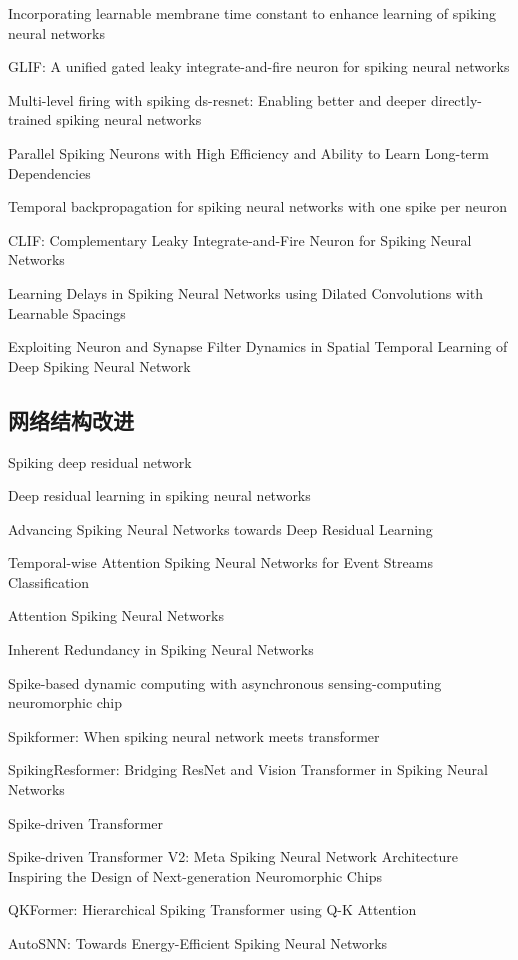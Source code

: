 \documentclass{SCIS2020cn}
\begin{document}
Incorporating learnable membrane time constant to enhance learning of spiking neural networks

GLIF: A unified gated leaky integrate-and-fire neuron for spiking neural networks

Multi-level firing with spiking ds-resnet: Enabling better and deeper directly-trained spiking neural networks

Parallel Spiking Neurons with High Efficiency and Ability to Learn Long-term Dependencies

Temporal backpropagation for spiking neural networks with one spike per neuron

CLIF: Complementary Leaky Integrate-and-Fire Neuron for Spiking Neural Networks


Learning Delays in Spiking Neural Networks using Dilated Convolutions with Learnable Spacings

Exploiting Neuron and Synapse Filter Dynamics in Spatial Temporal Learning of Deep Spiking Neural Network


\subsection{网络结构改进}%

Spiking deep residual network

Deep residual learning in spiking neural networks

Advancing Spiking Neural Networks towards Deep Residual Learning

Temporal-wise Attention Spiking Neural Networks for Event Streams Classification

Attention Spiking Neural Networks

Inherent Redundancy in Spiking Neural Networks

Spike-based dynamic computing with asynchronous sensing-computing neuromorphic chip

Spikformer: When spiking neural network meets transformer

SpikingResformer: Bridging ResNet and Vision Transformer in Spiking Neural Networks

Spike-driven Transformer

Spike-driven Transformer V2: Meta Spiking Neural Network Architecture Inspiring the Design of Next-generation Neuromorphic Chips

QKFormer: Hierarchical Spiking Transformer using Q-K Attention

AutoSNN: Towards Energy-Efficient Spiking Neural Networks
\end{document}
